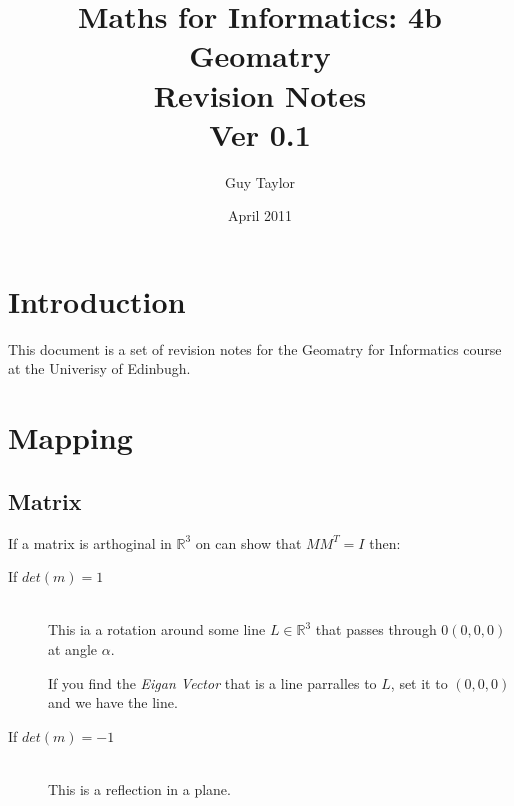 \documentclass[11pt,twoside,a4paper]{article}
\begin{document}
  
  \graphicspath{{img//}}
  
  \title{Maths for Informatics: 4b Geomatry \\Revision Notes \\ Ver 0.1}
  \author{Guy Taylor}
  \date{April 2011}
  
  \maketitle
  
  \tableofcontents
  
  \section{Introduction}
    This document is a set of revision notes for the Geomatry for Informatics course at the Univerisy of Edinbugh.
  
  \clearpage
  \section{Mapping}
    \subsection{Matrix}
      If a matrix is arthoginal in \(\mathbb{R}^3\) on can show that \(MM^T = I\) then:
      \begin{description}
        \item[If \(det(m) = 1\)] \hfill \\
          This ia a rotation around some line \(L \in \mathbb{R}^3\) that passes through \(0 (0,0,0)\) at angle \(\alpha\).
          
          If you find the \textit{Eigan Vector} that is a line parralles to \(L\), set it to \((0,0,0)\) and we have the line.
        
        \item[If \(det(m) = -1\)] \hfill \\
          This is a reflection in a plane.
      \end{description}
  
\end{document}
